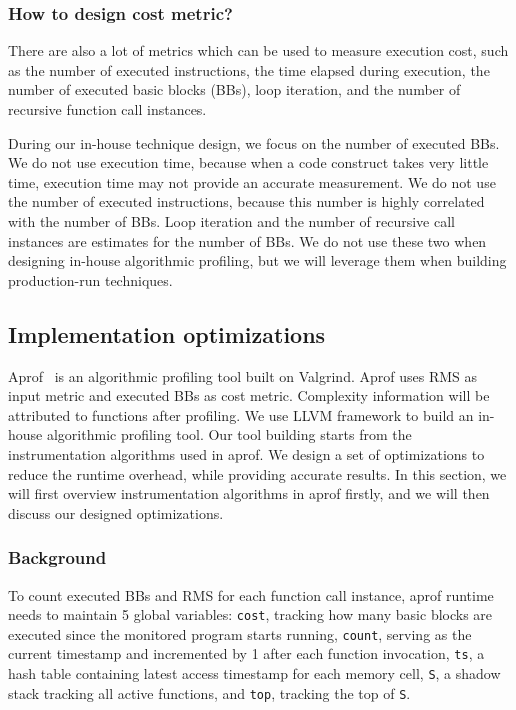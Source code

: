 \subsubsection{How to design cost metric?}
There are also a lot of metrics which can be used to measure execution cost, 
such as the number of executed instructions, 
the time elapsed during execution,
the number of executed basic blocks (BBs), 
loop iteration, 
and the number of recursive function call instances.

During our in-house technique design, 
we focus on the number of executed BBs. 
We do not use execution time, 
because when a code construct takes very little time,
execution time may not provide an accurate measurement. 
We do not use the number of executed instructions, 
because this number is highly correlated with the number of BBs. 
Loop iteration and the number of recursive call instances are estimates 
for the number of BBs. 
We do not use these two when designing in-house algorithmic profiling, 
but we will leverage them when building production-run techniques.  

\subsection{Implementation optimizations}

Aprof~\cite{Aprof1, Aprof2} is an algorithmic profiling tool built on Valgrind. 
Aprof uses RMS as input metric and executed BBs as cost metric.
Complexity information will be attributed to functions after profiling. 
We use LLVM framework to build an in-house algorithmic profiling tool.
Our tool building starts from the instrumentation algorithms used in aprof. 
We design a set of optimizations to reduce the runtime overhead, 
while providing accurate results.
In this section, we will first overview instrumentation algorithms in aprof firstly, 
and we will then discuss our designed optimizations. 

\subsubsection{Background}
To count executed BBs and RMS for each function call instance,
aprof runtime needs to maintain 5 global variables:
\texttt{cost}, 
tracking how many basic blocks are executed since the monitored program starts running, 
\texttt{count}, 
serving as the current timestamp and incremented by 1 after each function invocation, 
\texttt{ts}, 
a hash table containing latest access timestamp for each memory cell,
\texttt{S}, 
a shadow stack tracking all active functions, 
and \texttt{top}, 
tracking the top of \texttt{S}.

